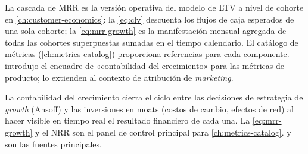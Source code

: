 La cascada de MRR es la versión operativa del modelo de LTV a nivel de cohorte en
\cref{ch:customer-economics}: la \cref{eq:clv} descuenta los flujos de caja esperados de
una sola cohorte; la \cref{eq:mrr-growth} es la manifestación mensual agregada de todas las
cohortes superpuestas sumadas en el tiempo calendario. El catálogo de métricas
(\cref{ch:metrics-catalog}) proporciona referencias para cada componente.
\textcite{ries2011} introdujo el encuadre de «contabilidad del crecimiento» para las
métricas de producto; \textcite{bendle2020marketing} lo extienden al contexto de
atribución de \emph{marketing}.

La contabilidad del crecimiento cierra el ciclo entre las decisiones de estrategia de
\emph{growth} (Ansoff) y las inversiones en moats (costos de cambio, efectos de red) al
hacer visible en tiempo real el resultado financiero de cada una. La \cref{eq:mrr-growth} y
el NRR son el panel de control principal para \cref{ch:metrics-catalog}.
\textcite{ries2011} y \textcite{bendle2020marketing} son las fuentes principales.
